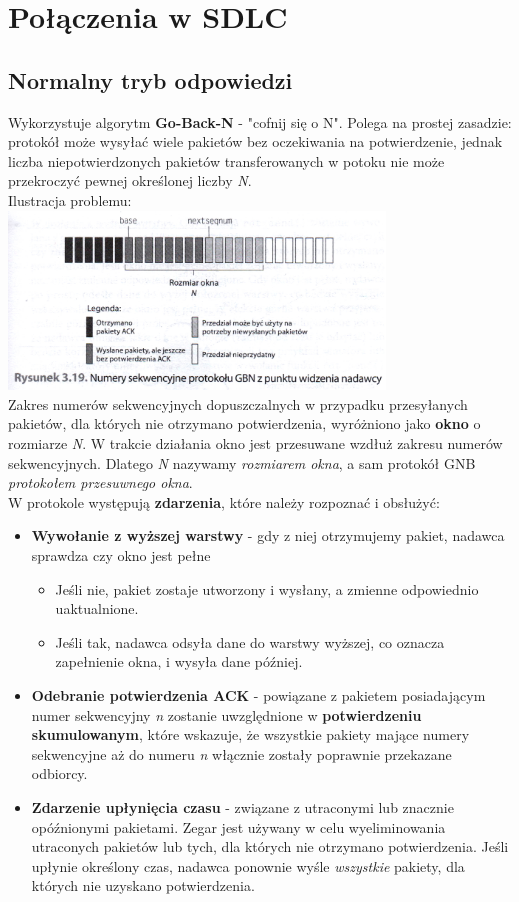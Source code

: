 \documentclass[a4paper,twoside]{article}
\begin{document}
\section{Połączenia w SDLC}
	\subsection{Normalny tryb odpowiedzi}
	Wykorzystuje algorytm \textbf{Go-Back-N} - "cofnij się o N". Polega na prostej zasadzie: protokół może wysyłać wiele pakietów bez oczekiwania na potwierdzenie, jednak liczba niepotwierdzonych pakietów transferowanych w potoku nie może przekroczyć pewnej określonej liczby \emph{N}.\\
	Ilustracja problemu:\\
	\includegraphics[width=10cm]{./images/image13.jpg}\\
	Zakres numerów sekwencyjnych dopuszczalnych w przypadku przesyłanych pakietów, dla których nie otrzymano potwierdzenia, wyróżniono jako \textbf{okno} o rozmiarze \emph{N}. W trakcie działania okno jest przesuwane wzdłuż zakresu numerów sekwencyjnych. Dlatego \emph{N} nazywamy \textit{rozmiarem okna}, a sam protokół GNB \textit{protokołem przesuwnego okna}.\\
	W protokole występują \textbf{zdarzenia}, które należy rozpoznać i obsłużyć:
	\begin{itemize}
		\item \textbf{Wywołanie z wyższej warstwy} - gdy z niej otrzymujemy pakiet, nadawca sprawdza czy okno jest pełne
		\begin{itemize}
			\item Jeśli nie, pakiet zostaje utworzony i wysłany, a zmienne odpowiednio uaktualnione.
			\item Jeśli tak, nadawca odsyła dane do warstwy wyższej, co oznacza zapełnienie okna, i wysyła dane później.
		\end{itemize}
		\item \textbf{Odebranie potwierdzenia ACK} - powiązane z pakietem posiadającym numer sekwencyjny \emph{n} zostanie uwzględnione w \textbf{potwierdzeniu skumulowanym}, które wskazuje, że wszystkie pakiety mające numery sekwencyjne aż do numeru \emph{n} włącznie zostały poprawnie przekazane odbiorcy.
		\item \textbf{Zdarzenie upłynięcia czasu} - związane z utraconymi lub znacznie opóźnionymi pakietami. Zegar jest używany w celu wyeliminowania utraconych pakietów lub tych, dla których nie otrzymano potwierdzenia. Jeśli upłynie określony czas, nadawca ponownie wyśle \emph{wszystkie} pakiety, dla których nie uzyskano potwierdzenia.
	\end{itemize}
\end{document}
